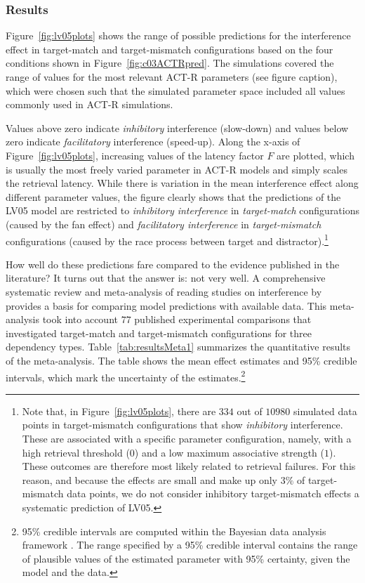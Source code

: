 \documentclass{cambridge7A}\usepackage[]{graphicx}\usepackage[]{color}
\begin{document}
\subsubsection{Results}
Figure~\ref{fig:lv05plots} shows the range of possible predictions for the interference effect in target-match and target-mismatch configurations based on the four conditions shown in Figure~\ref{fig:c03ACTRpred}.
The simulations covered the range of values for the most relevant ACT-R parameters (see figure caption), which were chosen such that the simulated parameter space included all values commonly used in ACT-R simulations.

Values above zero indicate  \emph{inhibitory} interference (slow-down) and values below zero indicate  \emph{facilitatory} interference (speed-up). 
Along the x-axis of Figure~\ref{fig:lv05plots}, increasing values of the latency factor $F$ are plotted, which is usually the most freely varied parameter in ACT-R models and simply scales the retrieval latency. 
While there is variation in the mean interference effect along different parameter values, the figure clearly shows that the predictions of the LV05 model are restricted to \emph{inhibitory interference} in \emph{target-match} configurations (caused by the fan effect) and \emph{facilitatory interference} in \emph{target-mismatch} configurations (caused by the race process between target and distractor).\footnote{Note that, in Figure~\ref{fig:lv05plots}, there are $334$ out of $10980$ simulated data points in target-mismatch configurations that show \textit{inhibitory} interference. These are associated with a specific parameter configuration, namely, with a high retrieval threshold ($0$) and a low maximum associative strength ($1$). These outcomes are therefore most likely related to retrieval failures. For this reason, and because the effects are small and make up only $3\%$ of target-mismatch data points, we do not consider inhibitory target-mismatch effects a systematic prediction of LV05.}

How well do these predictions fare compared to the evidence published in the literature? It turns out that the answer is: not very well. 
A comprehensive systematic review and  meta-analysis of reading studies on interference by \cite{JaegerEngelmannVasishth2017} provides a basis for comparing model predictions with available data. This meta-analysis took into account $77$ published experimental comparisons that investigated target-match and target-mismatch configurations for three dependency types. Table~\ref{tab:resultsMeta1} summarizes the quantitative results of the meta-analysis. The table shows the mean effect estimates and 95\% credible intervals, which mark the uncertainty of the estimates.\footnote{95\% credible intervals are computed within the Bayesian data analysis framework \citep{Gelman14}. The range specified by a 95\% credible interval contains the range of plausible values of the estimated parameter with 95\% certainty, given the model and the data.}
\end{document}

